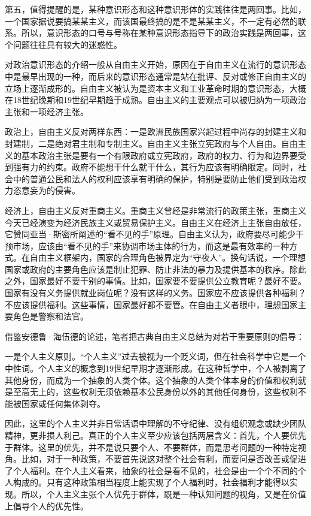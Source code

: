 第五，值得提醒的是，某种意识形态和这种意识形体的实践往往是两回事。比如，一个国家据说要搞某某主义，而该国最终搞的是不是某某主义，不一定有必然的联系。所以，意识形态的口号与号称在某种意识形态指导下的政治实践是两回事，这个问题往往具有较大的迷惑性。


对政治意识形态的介绍一般从自由主义开始，原因在于自由主义在流行的意识形态中是最早出现的一种，而后来的意识形态通常是站在批评、反对或修正自由主义的立场上逐渐成形的。自由主义被认为是资本主义和工业革命时期的意识形态，大概在18世纪晚期和19世纪早期趋于成熟。自由主义的主要观点可以被归纳为一项政治主张和一项经济主张。

政治上，自由主义反对两样东西：一是欧洲民族国家兴起过程中尚存的封建主义和封建制，二是绝对君主制和专制主义。自由主义主张立宪政府与个人自由。自由主义的基本政治主张是要有一个有限政府或立宪政府，政府的权力、行为和边界要受到强有力的约束。政府不能想干什么就干什么，其行为应该有明确限定。同时，社会中的普通公民和法人的权利应该享有明确的保护，特别是要防止他们受到政治权力恣意妄为的侵害。

经济上，自由主义反对重商主义。重商主义曾经是非常流行的政策主张，重商主义今天已经演变为经济民族主义或贸易保护主义。自由主义在经济上主张自由放任，它赞同亚当·斯密所阐述的“看不见的手”原理。自由主义认为，政府要尽可能少干预市场，应该由“看不见的手”来协调市场主体的行为，而这是最有效率的一种方式。在自由主义框架内，国家的合理角色被界定为“守夜人”。换句话说，一个理想国家或政府的主要角色应该是制止犯罪、防止非法的暴力及提供基本的秩序。除此之外，国家最好不要干别的事情。比如，国家要不要提供公立教育呢？最好不要。国家有没有义务提供就业岗位呢？没有这样的义务。国家应不应该提供各种福利？不应该提供福利。这些事情，国家最好都不要管。在自由主义者眼中，理想国家主要角色是警察和法官。

借鉴安德鲁·海伍德的论述，笔者把古典自由主义总结为对若干重要原则的倡导：

一是个人主义原则。“个人主义”过去被视为一个贬义词，但在社会科学中它是一个中性词。个人主义的概念到19世纪早期才逐渐形成。在这种哲学中，个人被剥离了其他身份，而成为一个抽象的人类个体。这个抽象的人类个体本身的价值和权利就是至高无上的，这些权利无须依赖基本公民身份以外的其他任何身份，这些权利不能被国家或任何集体剥夺。

因此，这里的个人主义并非日常话语中理解的不守纪律、没有组织观念或缺少团队精神，更非损人利己。真正的个人主义至少应该包括两层含义：首先，个人要优先于群体。这里的优先，并不是说只要个人、不要群体，而是思考问题的一种特定视角。比如，对于一种政策，不要首先说这对整个社会有利，而要问是否改善或促进了个人福利。在个人主义看来，抽象的社会是看不见的，社会是由一个个不同的个人构成的。只有这种政策相当程度上能实现了个人福利时，社会福利才能得以实现。所以，个人主义主张个人优先于群体，既是一种认知问题的视角，又是在价值上倡导个人的优先性。

